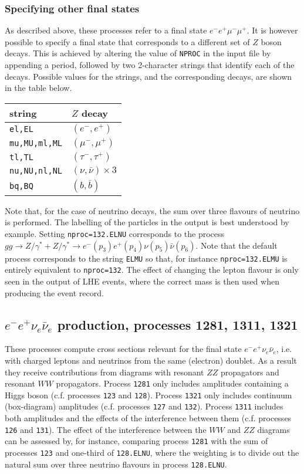 \subsubsection{Specifying other final states}
\label{specifyingZdecays}
As described above, these processes refer to a final state 
$e^- e^+ \mu^- \mu^+$.  It is however possible to specify a final state
that corresponds to a different set of $Z$ boson decays.  This is achieved
by altering the value of {\tt NPROC} in the input file by appending a
period, followed by two 2-character strings that identify each of the decays.
Possible values for the strings, and the corresponding decays, are
shown in the table below.
\begin{center}
\begin{tabular}{ll}
string & $Z$ decay \\
\hline
{\tt el,EL} & $(e^-,e^+)$ \\
{\tt mu,MU,ml,ML} & $(\mu^-,\mu^+)$ \\
{\tt tl,TL} & $(\tau^-,\tau^+)$ \\
{\tt nu,NU,nl,NL} & $(\nu,\bar\nu) \times 3$ \\
{\tt bq,BQ} & $(b,\bar b)$ \\
\end{tabular}
\end{center}
Note that, for the case of neutrino decays, the sum over three flavours of
neutrino is performed.  The labelling of the particles in the output is best
understood by example.  Setting {\tt nproc=132.ELNU} corresponds to the
process $gg \to Z/\gamma^*+Z/\gamma^* \to e^-(p_3) e^+(p_4) \nu(p_5) \bar\nu(p_6)$.
Note that the default process corresponds to the string {\tt ELMU} so that,
for instance {\tt nproc=132.ELMU} is entirely equivalent to
{\tt nproc=132}.
The effect of changing the lepton flavour is only seen in the output
of LHE events, where the correct mass is then used when producing the
event record.

\subsection{$e^- e^+ \nu_e \bar \nu_e$ production, processes 1281, 1311, 1321}
These processes compute cross sections relevant for the final state
$e^- e^+ \nu_e \bar \nu_e$, i.e. with charged leptons and neutrinos from the
same (electron) doublet.  As a result they receive contributions from diagrams
with resonant $ZZ$ propagators and resonant $WW$ propagators.  Process
{\tt 1281} only includes amplitudes containing a Higgs boson (c.f. processes
{\tt 123} and {\tt 128}). Process
{\tt 1321} only includes continuum (box-diagram) amplitudes (c.f. processes
{\tt 127} and {\tt 132}). Process
{\tt 1311} includes both amplitudes and the effects of the interference
between them (c.f. processes {\tt 126} and {\tt 131}).
The effect of the interference between the $WW$ and $ZZ$ diagrams can be assessed
by, for instance, comparing process {\tt 1281} with the sum of processes
{\tt 123} and one-third of {\tt 128.ELNU}, where the weighting is to divide out
the natural sum over three neutrino flavours in process {\tt 128.ELNU}.

